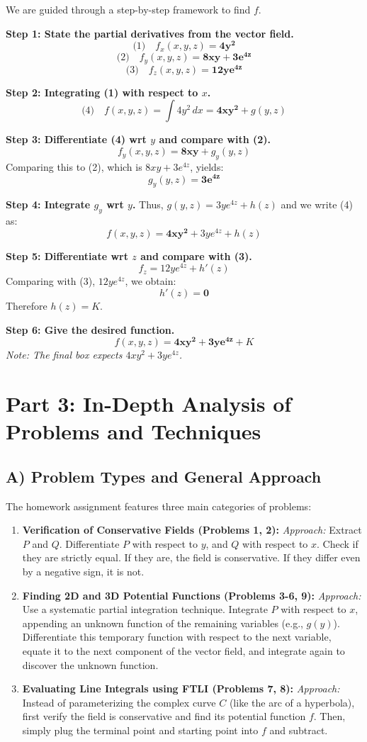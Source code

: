 \documentclass[12pt]{article}
\begin{document}
We are guided through a step-by-step framework to find $f$.

\textbf{Step 1: State the partial derivatives from the vector field.}
\[
\text{(1)} \quad f_x(x, y, z) = \mathbf{4y^2}
\]
\[
\text{(2)} \quad f_y(x, y, z) = \mathbf{8xy + 3e^{4z}}
\]
\[
\text{(3)} \quad f_z(x, y, z) = \mathbf{12ye^{4z}}
\]

\textbf{Step 2: Integrating (1) with respect to $x$.}
\[
\text{(4)} \quad f(x, y, z) = \int 4y^2 \, dx = \mathbf{4xy^2} + g(y, z)
\]

\textbf{Step 3: Differentiate (4) wrt $y$ and compare with (2).}
\[
f_y(x, y, z) = \mathbf{8xy} + g_y(y, z)
\]
Comparing this to (2), which is $8xy + 3e^{4z}$, yields:
\[
g_y(y, z) = \mathbf{3e^{4z}}
\]

\textbf{Step 4: Integrate $g_y$ wrt $y$.}
Thus, $g(y, z) = 3ye^{4z} + h(z)$ and we write (4) as:
\[
f(x, y, z) = \mathbf{4xy^2} + 3ye^{4z} + h(z)
\]

\textbf{Step 5: Differentiate wrt $z$ and compare with (3).}
\[
f_z = 12ye^{4z} + h'(z)
\]
Comparing with (3), $12ye^{4z}$, we obtain:
\[
h'(z) = \mathbf{0}
\]
Therefore $h(z) = K$.

\textbf{Step 6: Give the desired function.}
\[
f(x, y, z) = \mathbf{4xy^2 + 3ye^{4z}} + K
\]
\textit{Note: The final box expects $4xy^2 + 3ye^{4z}$.}

\newpage
\section{Part 3: In-Depth Analysis of Problems and Techniques}

\subsection{A) Problem Types and General Approach}
The homework assignment features three main categories of problems:
\begin{enumerate}
    \item \textbf{Verification of Conservative Fields (Problems 1, 2):}
    \textit{Approach:} Extract $P$ and $Q$. Differentiate $P$ with respect to $y$, and $Q$ with respect to $x$. Check if they are strictly equal. If they are, the field is conservative. If they differ even by a negative sign, it is not.
    \item \textbf{Finding 2D and 3D Potential Functions (Problems 3-6, 9):}
    \textit{Approach:} Use a systematic partial integration technique. Integrate $P$ with respect to $x$, appending an unknown function of the remaining variables (e.g., $g(y)$). Differentiate this temporary function with respect to the next variable, equate it to the next component of the vector field, and integrate again to discover the unknown function. 
    \item \textbf{Evaluating Line Integrals using FTLI (Problems 7, 8):}
    \textit{Approach:} Instead of parameterizing the complex curve $C$ (like the arc of a hyperbola), first verify the field is conservative and find its potential function $f$. Then, simply plug the terminal point and starting point into $f$ and subtract. 
\end{enumerate}
\end{document}
